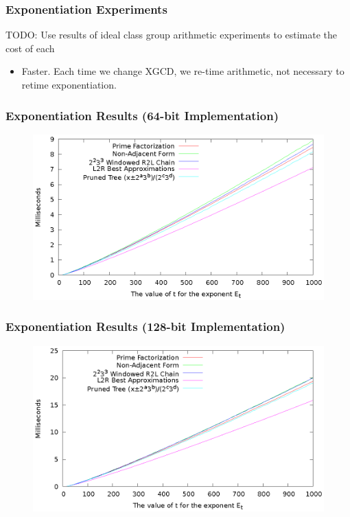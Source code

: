 \documentclass{beamer}
\begin{document}
\begin{frame}
\frametitle{Exponentiation Experiments}
TODO: Use results of ideal class group arithmetic experiments to estimate the cost of each
\begin{itemize}
\item Faster.  Each time we change XGCD, we re-time arithmetic, not necessary to retime exponentiation.
\end{itemize}
\end{frame}

\begin{frame}
\frametitle{Exponentiation Results (64-bit Implementation)}

\begin{figure}
\includegraphics[scale=0.86]{winners-64}
\end{figure}

\end{frame}

\begin{frame}
\frametitle{Exponentiation Results (128-bit Implementation)}

\begin{figure}
\includegraphics[scale=0.86]{winners-128}
\end{figure}

\end{frame}
\end{document}
